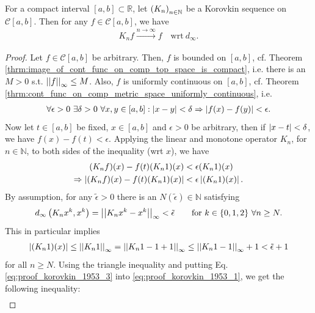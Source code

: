 \begin{theorem}[Korovkin, 1953]\label{thrm:korovkin_1953}
	For a compact interval $[a, b]\subset \mathbb R$, let $\seq[K_n]$ be a Korovkin sequence on $\mathcal C[a, b]$. Then for any $f\in\mathcal C[a, b]$, we have
	\begin{align}
		K_nf \overset{n\to\infty}{\longrightarrow} f \quad \text{wrt}\ d_{\infty}.
	\end{align}
\end{theorem}

\begin{proof}
	Let $f\in\mathcal C[a, b]$ be arbitrary. Then, $f$ is bounded on $[a, b]$, cf. Theorem \ref{thrm:image_of_cont_func_on_comp_top_space_is_compact}, i.e. there is an $M > 0$ s.t. $\norm{f}{\infty} \leq M$. Also, $f$ is uniformly continuous on $[a, b]$, cf. Theorem \ref{thrm:cont_func_on_comp_metric_space_uniformly_continuous}, i.e.
	\begin{align}
		\forall \epsilon > 0\ \exists \delta > 0\ \forall x, y\in [a, b]: \abs{x - y} < \delta \Rightarrow \abs{f(x) - f(y)} < \epsilon.
	\end{align}
	Now let $t\in[a, b]$ be fixed, $x\in[a, b]$ and $\epsilon > 0$ be arbitrary, then if $\abs{x - t} < \delta$, we have $f(x) - f(t) < \epsilon$. Applying the linear and monotone operator $K_n$, for $n\in\mathbb N$, to both sides of the inequality (wrt $x$), we have
	\begin{align}
		(K_nf)(x) - f(t)(K_n1)(x) &< \epsilon (K_n 1)(x)
		\\ \Rightarrow \abs{(K_nf)(x) - f(t)(K_n1)(x)} &< \epsilon\abs{(K_n 1)(x)}.\label{eq:proof_korovkin_1953_1}
	\end{align}
	By assumption, for any $\tilde{\epsilon} > 0$ there is an $N(\tilde{\epsilon})\in\mathbb N$ satisfying 
	\begin{align}\label{eq:proof_korovkin_1953_2}
		d_{\infty}\left(K_n x^k, x^k\right) = \norm{K_nx^k - x^k}{\infty} < \tilde{\epsilon} \qquad \text{for}\ k\in\{0, 1, 2\}\ \forall n\geq N.
	\end{align}
	This in particular implies
	\begin{align}\label{eq:proof_korovkin_1953_3}
		\abs{(K_n1)(x)} \leq \norm{K_n1}{\infty} = \norm{K_n1 - 1 + 1}{\infty} \leq \norm{K_n1 - 1}{\infty} + 1 < \tilde{\epsilon} + 1
	\end{align}
	for all $n\geq N$. Using the triangle inequality and putting Eq. \eqref{eq:proof_korovkin_1953_3} into \eqref{eq:proof_korovkin_1953_1}, we get the following inequality:
	\begin{align}

\end{align}
\end{proof}
